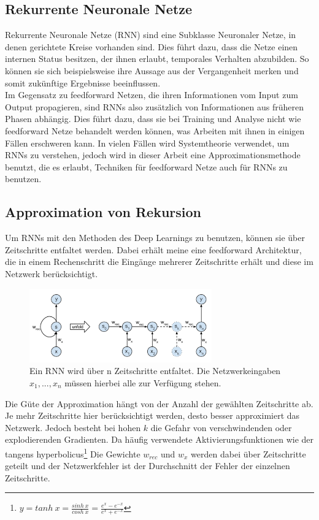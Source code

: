 \subsection{Rekurrente Neuronale Netze}
Rekurrente Neuronale Netze (RNN) sind eine Subklasse Neuronaler Netze, in denen gerichtete Kreise vorhanden sind. Dies führt dazu, dass die Netze einen internen Status besitzen, der ihnen erlaubt, temporales Verhalten abzubilden. So können sie sich beispielsweise ihre Aussage aus der Vergangenheit merken und somit zukünftige Ergebnisse beeinflussen.\\
Im Gegensatz zu feedforward Netzen, die ihren Informationen vom Input zum Output propagieren, sind RNNs also zusätzlich von Informationen aus früheren Phasen abhängig. Dies führt dazu, dass sie bei Training und Analyse nicht wie feedforward Netze behandelt werden können, was Arbeiten mit ihnen in einigen Fällen erschweren kann. In vielen Fällen wird Systemtheorie verwendet, um RNNs zu verstehen, jedoch wird in dieser Arbeit eine Approximationsmethode benutzt, die es erlaubt, Techniken für feedforward Netze auch für RNNs zu benutzen.
\subsection{Approximation von Rekursion}
Um RNNs mit den Methoden des Deep Learnings zu benutzen, können sie über Zeitschritte entfaltet werden. Dabei erhält meine eine feedforward Architektur, die in einem Rechenschritt die Eingänge mehrerer Zeitschritte erhält und diese im Netzwerk berücksichtigt. 
\begin{figure}[h!] 
	\centering
	\includegraphics[width=0.7\textwidth]{abb/rnn.png}
	\caption{Ein RNN wird über n Zeitschritte entfaltet. Die Netzwerkeingaben $x_1,..., x_n$ müssen hierbei alle zur Verfügung stehen.}
	\label{img:rnn}
\end{figure}
Die Güte der Approximation hängt von der Anzahl der gewählten Zeitschritte ab. Je mehr Zeitschritte hier berücksichtigt werden, desto besser approximiert das Netzwerk. Jedoch besteht bei hohen $k$ die Gefahr von verschwindenden oder explodierenden Gradienten. Da häufig verwendete Aktivierungsfunktionen wie der tangens hyperbolicus\footnote{$y = tanh\ x = \frac{sinh\ x}{cosh\ x} = \frac{e^x - e^{-x}}{e^x + e^{-x}}$} Die Gewichte $w_{rec}$ und $w_x$ werden dabei über Zeitschritte geteilt und der Netzwerkfehler ist der Durchschnitt der Fehler der einzelnen Zeitschritte. 
